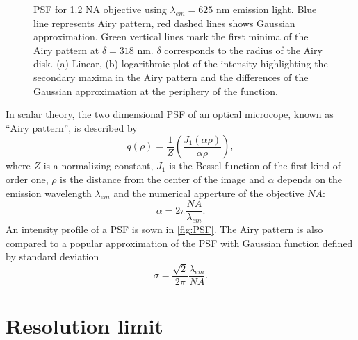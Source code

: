 \begin{figure}[!bht]
	\centering
	\newcommand{\wf}{.48\textwidth}
	\caption{PSF for 1.2 NA objective using $\lambda_{em}=625$ nm emission light. Blue line represents Airy pattern, red dashed lines shows Gaussian approximation. Green vertical lines mark the first minima of the Airy pattern at $\delta=318$ nm. $\delta$ corresponds to the radius of the Airy disk. (a) Linear, (b) logarithmic plot of the intensity highlighting the secondary maxima in the Airy pattern and the differences of the Gaussian approximation at the periphery of the function.}
	\label{fig:PSF}
\end{figure}
%
In scalar theory, the two dimensional PSF of an optical microcope, known as ``Airy pattern'', is described by
%
\begin{equation}
	q(\rho)=\frac{1}{Z}\left(\frac{J_1(\alpha \rho)}{\alpha \rho}\right),
\end{equation}
%
where $Z$ is a normalizing constant, $J_1$ is the Bessel function of the first kind of order one, $\rho$ is the distance from the center of the image and $\alpha$ depends on the emission wavelength $\lambda_{em}$ and the numerical apperture of the objective $\unit{NA}$:
%
\begin{equation}
	\alpha=2\pi\frac{\unit{NA}}{\lambda_{em}}.
\end{equation}
% 
An intensity profile of a PSF is sown in \autoref{fig:PSF}. The Airy pattern is also compared to a popular approximation of the PSF with Gaussian function \cite{Zhang2007} defined by standard deviation
%
\begin{equation}
	\sigma=\frac{\sqrt{2}}{2\pi}\frac{\lambda_{em}}{\unit{NA}}.
\end{equation}


\section{Resolution limit \label{sed:Resolutin limit}}

